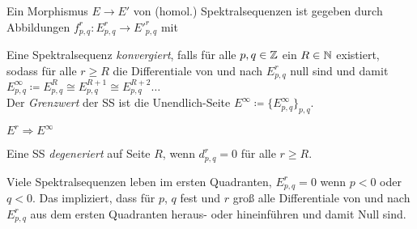 \documentclass{cheat-sheet}
\newenvironment{centertikzcd}
  {\begin{center}\begin{tikzcd}}
  {\end{tikzcd}\end{center}}
\begin{document}
\begin{defn}
  Ein Morphismus $E \to E'$ von (homol.) Spektralsequenzen ist gegeben durch Abbildungen $f^r_{p,q} : E^r_{p,q} \to E'^r_{p,q}$ mit
  \begin{itemize}
  \end{itemize}
\end{defn}

\begin{defn}
  Eine Spektralsequenz \emph{konvergiert}, falls für alle $p, q \in \mathbb{Z}$ ein $R \in \mathbb{N}$ existiert, sodass für alle $r \geq R$ die Differentiale von und nach $E^r_{p,q}$ null sind und damit $E^\infty_{p,q} \coloneqq E^R_{p,q} \cong E^{R+1}_{p,q} \cong E^{R+2}_{p,q} \ldots$ \\
  Der \emph{Grenzwert} der SS ist die Unendlich-Seite $E^\infty \coloneqq \{ E^\infty_{p,q} \}_{p,q}$.
\end{defn}

\begin{nota}
  $E^r \Rightarrow E^\infty$
\end{nota}

\begin{defn}
  Eine SS \emph{degeneriert} auf Seite $R$, wenn $d^r_{p,q} \!=\! 0$ für alle $r \!\geq\! R$.
\end{defn}

\iffalse
\begin{bem}
  Das entspricht einer Art gleichmäßigen Konvergenz.
\end{bem}
\fi

\begin{bem}
  Viele Spektralsequenzen leben im ersten Quadranten, \dh{} $E^r_{p,q} = 0$ wenn $p < 0$ oder $q < 0$. Das impliziert, dass für $p$, $q$ fest und $r$ groß alle Differentiale von und nach $E^r_{p,q}$ aus dem ersten Quadranten heraus- oder hineinführen und damit Null sind.
\end{bem}

\end{document}
